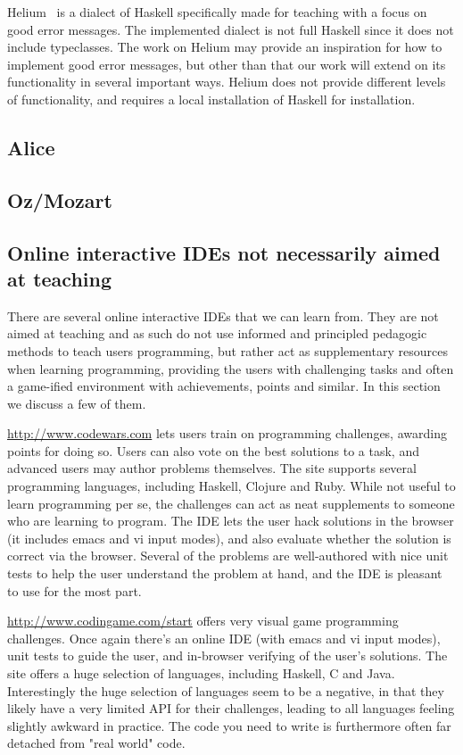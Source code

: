 Helium~\cite{DBLP:conf/haskell/HeerenLI03} is a dialect of Haskell specifically
made for teaching with a focus on good error messages. The implemented dialect
is not full Haskell since it does not include typeclasses. The work on Helium
may provide an inspiration for how to implement good error messages, but other
than that our work will extend on its functionality in several important ways.
Helium does not provide different levels of functionality, and requires a local
installation of Haskell for installation.

\subsection{Alice}

\subsection{Oz/Mozart}

\subsection{Online interactive IDEs not necessarily aimed at teaching}
There are several online interactive IDEs that we can learn from. They are not 
aimed at teaching and as such do not use informed and principled pedagogic 
methods to teach users programming, but rather act as supplementary resources 
when learning programming, providing the users with challenging tasks and 
often a game-ified environment with achievements, points and similar. In this 
section we discuss a few of them.

\url{http://www.codewars.com} lets users train on programming challenges, 
awarding points for doing so. Users can also vote on the best solutions to a 
task, and advanced users may author problems themselves. The site supports 
several programming languages, including Haskell, Clojure and Ruby. While not 
useful to learn programming per se, the challenges can act as neat supplements 
to someone who are learning to program. The IDE lets the user hack solutions 
in the browser (it includes emacs and vi input modes), and also evaluate 
whether the solution is correct via the browser. Several of the problems are 
well-authored with nice unit tests to help the user understand the problem at 
hand, and the IDE is pleasant to use for the most part.

\url{http://www.codingame.com/start} offers very visual game programming 
challenges. Once again there's an online IDE (with emacs and vi input modes), 
unit tests to guide the user, and in-browser verifying of the user's 
solutions. The site offers a huge selection of languages, including Haskell, C 
and Java. Interestingly the huge selection of languages seem to be a negative, 
in that they likely have a very limited API for their challenges, leading to 
all languages feeling slightly awkward in practice. The code you need to write 
is furthermore often far detached from "real world" code.

